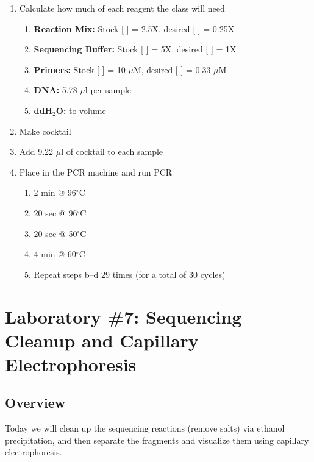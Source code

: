 \documentclass[12pt, hidelinks]{article}
\begin{document}
		\begin{enumerate}
			\item Calculate how much of each reagent the class will need
				\begin{enumerate}
					\item \textbf{Reaction Mix:} Stock [ ] = 2.5X, desired [ ] = 0.25X
					\item \textbf{Sequencing Buffer:} Stock [ ] = 5X, desired [ ] = 1X
					\item \textbf{Primers:} Stock [ ] = 10 $\mu$M, desired [ ] = 0.33 $\mu$M
					\item \textbf{DNA:} 5.78 $\mu$l per sample
					\item \textbf{ddH$_{2}$O:} to volume
				\end{enumerate}
			\item Make cocktail
			\item Add 9.22 $\mu$l of cocktail to each sample
			\item Place in the PCR machine and run PCR
				\begin{enumerate}
					\item 2 min @ 96$^{\circ}$C
					\item 20 sec @ 96$^{\circ}$C
					\item 20 sec @ 50$^{\circ}$C
					\item 4 min @ 60$^{\circ}$C
					\item Repeat steps b--d 29 times (for a total of 30 cycles)
				\end{enumerate}
		\end{enumerate}


\newpage
\section{Laboratory \#7: Sequencing Cleanup and Capillary Electrophoresis}


	\subsection{Overview}
	Today we will clean up the sequencing reactions (remove salts) via ethanol precipitation, and then separate the fragments and visualize them using capillary electrophoresis. 
	
	
\end{document}
